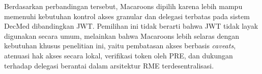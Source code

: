 Berdasarkan perbandingan tersebut, Macaroons dipilih karena lebih mampu memenuhi kebutuhan kontrol akses granular dan delegasi terbatas pada sistem DecMed dibandingkan JWT. Pemilihan ini tidak berarti bahwa JWT tidak layak digunakan secara umum, melainkan bahwa Macaroons lebih selaras dengan kebutuhan khusus penelitian ini, yaitu pembatasan akses berbasis \textit{caveats}, atenuasi hak akses secara lokal, verifikasi token oleh PRE, dan dukungan terhadap delegasi berantai dalam arsitektur RME terdesentralisasi.
